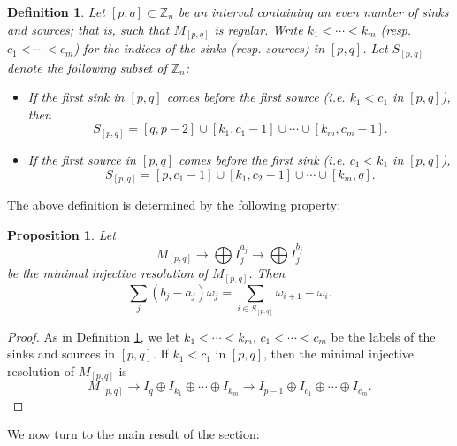 \documentclass[12pt]{amsart}
\newcommand{\ZZ}{\mathbb{Z}}
\newtheorem{definition}[theorem]{Definition}
\newtheorem{proposition}[theorem]{Proposition}
\theoremstyle{remark}
\numberwithin{equation}{section}
\begin{document}
\begin{definition}\label{def:Spq}
Let $[p,q] \subset \ZZ_n$ be an interval containing an even number of sinks and sources; that is, such that $M_{[p,q]}$ is regular. Write $k_1 < \cdots < k_m$ (resp. $c_1 < \cdots < c_m$) for the indices of the sinks (resp. sources) in $[p,q]$. Let $S_{[p,q]}$ denote the following subset of $\ZZ_n$:
\begin{itemize}
\item If the first sink in $[p,q]$ comes before the first source (i.e. $k_1 < c_1$ in $[p,q]$), then 
\[
S_{[p,q]} = [q,p-2] \cup [k_1, c_1 -1] \cup \cdots \cup [k_m, c_m - 1].
\]
\item If the first source in $[p,q]$ comes before the first sink (i.e. $c_1 < k_1$ in $[p,q]$),
\[
S_{[p,q]} = [p,c_1-1] \cup [k_1,c_2-1] \cup \cdots \cup [k_m,q].
\]
\end{itemize}
\end{definition}

The above definition is determined by the following property:
\begin{proposition}
Let 
\[
M_{[p,q]} \to \bigoplus I_j^{a_j} \to \bigoplus I_j^{b_j}
\]
be the minimal injective resolution of $M_{[p,q]}$. Then
\[
\sum_j (b_j - a_j)\omega_j = \sum_{i \in S_{[p,q]}} \omega_{i+1} - \omega_i.
\]
\end{proposition}
\begin{proof}
As in Definition \ref{def:Spq}, we let $k_1 < \cdots < k_m$, $c_1 < \cdots < c_m$ be the labels of the sinks and sources in $[p,q]$. If $k_1 < c_1$ in $[p,q]$, then the minimal injective resolution of $M_{[p,q]}$ is
\[
M_{[p,q]} \to I_q \oplus I_{k_1} \oplus \cdots \oplus I_{k_m} \to I_{p-1} \oplus I_{c_1} \oplus \cdots \oplus I_{c_m}.
\]
\end{proof}

We now turn to the main result of the section:
\end{document}
